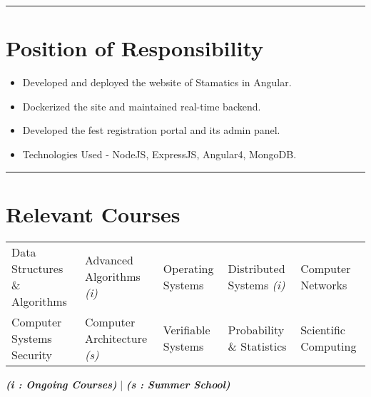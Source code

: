 \documentclass[10pt, margin=0.5in]{deedy-resume-openfont}
\begin{document}
\begin{minipage}[t]{0.48\textwidth}
\vspace{2pt}				%
\rule{\textwidth}{0.5pt}	%
\vspace{-16pt}				%

\section{Position of Responsibility}
\begin{itemize}[leftmargin=*, noitemsep]
  \item Developed and deployed the website of Stamatics in Angular.
  \item Dockerized the site and maintained real-time backend.	
\end{itemize}	
\begin{itemize}[leftmargin=*, noitemsep]
  \item Developed the fest registration portal and its admin panel.
  \item Technologies Used - NodeJS, ExpressJS, Angular4, MongoDB.	
\end{itemize}

\end{minipage}

\vspace{2pt}				%
\rule{\textwidth}{0.5pt}	%
\vspace{-18pt}				%

\section{\hspace{0.5cm}Relevant Courses}
\hspace{-6pt} \begin{tabular*}{\textwidth}{lllll}
Data Structures \& Algorithms & Advanced Algorithms \textit{(i)} & Operating Systems & Distributed Systems \textit{(i)} & Computer Networks \\
Computer Systems Security & Computer Architecture \textit{(s)} & Verifiable Systems & Probability \& Statistics &  Scientific Computing
\end{tabular*}


\hspace{-2pt} {\footnotesize \textit{\textbf{ (i : Ongoing Courses)}} | \textit{\textbf{ (s : Summer School)}}}
\end{document}
